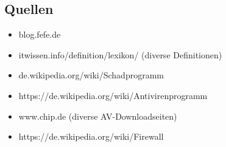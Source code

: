 \documentclass[
	11pt,
	DIV=15,
	parskip=full,    %
]{scrartcl}
\begin{document}
	
	
	
	
	\titlespacing{\subsection}{12pt}{-0.5em}{-0.5em}
	
	\subsection*{Quellen}
	\begin{itemize}
		\itemsep-7pt
		\item blog.fefe.de
		\item itwissen.info/definition/lexikon/ (diverse Definitionen)
		\item de.wikipedia.org/wiki/Schadprogramm
		\item https://de.wikipedia.org/wiki/Antivirenprogramm
		\item www.chip.de (diverse AV-Downloadseiten) 
		\item https://de.wikipedia.org/wiki/Firewall
	\end{itemize}
	

	
\end{document}
